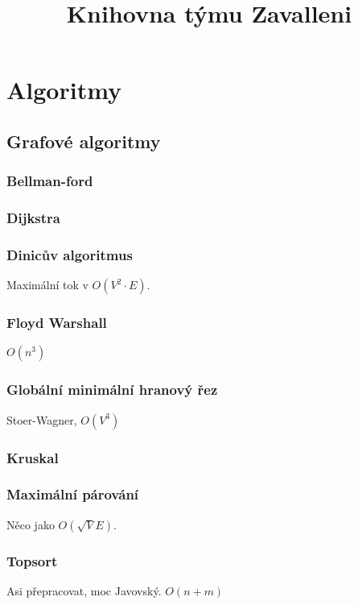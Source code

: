 \documentclass[10pt, a4paper]{article}
\title{Knihovna týmu Zavalleni}
\begin{document}
\section{Algoritmy}
\subsection{Grafové algoritmy}

\subsubsection{Bellman-ford}


\subsubsection{Dijkstra}


\subsubsection{Dinicův algoritmus}
Maximální tok v $O(V^2 \cdot E)$.


\subsubsection{Floyd Warshall}
$O(n^3)$


\subsubsection{Globální minimální hranový řez}
Stoer-Wagner, $O(V^3)$


\subsubsection{Kruskal}


\subsubsection{Maximální párování}
Něco jako $O(\sqrt{V}E)$.


\subsubsection{Topsort}
Asi přepracovat, moc Javovský. $O(n + m)$

\end{document}

